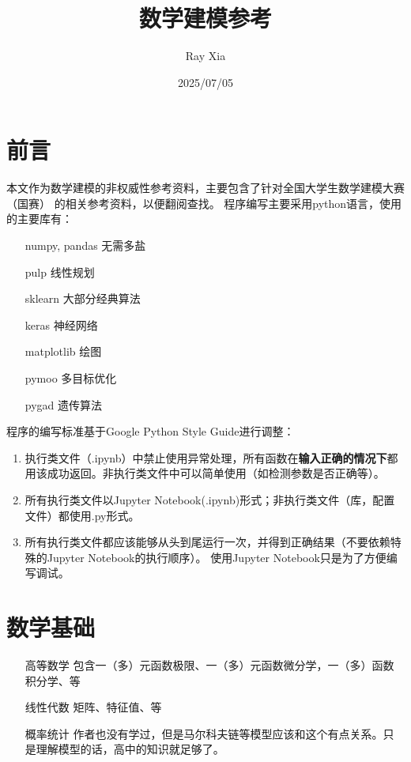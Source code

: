 \documentclass{article}
\title{数学建模参考}
\author{Ray Xia}
\date{2025/07/05}
\begin{document}
\maketitle

\tableofcontents

\newpage


\section{前言 }

本文作为数学建模的非权威性参考资料，主要包含了针对全国大学生数学建模大赛（国赛）
的相关参考资料，以便翻阅查找。
程序编写主要采用python语言，使用的主要库有：

\begin{itemize}
    \item[numpy, pandas] 无需多盐
    \item[pulp] 线性规划
    \item[sklearn] 大部分经典算法
    \item[keras] 神经网络
    \item[matplotlib] 绘图
    \item[pymoo] 多目标优化
    \item[pygad] 遗传算法
\end{itemize}

程序的编写标准基于Google Python Style Guide进行调整：

\begin{enumerate}
    \item 执行类文件（.ipynb）中禁止使用异常处理，所有函数在\textbf{输入正确的情况下}都用该成功返回。非执行类文件中可以简单使用（如检测参数是否正确等）。
    \item 所有执行类文件以Jupyter Notebook(.ipynb)形式；非执行类文件（库，配置文件）都使用.py形式。
    \item 所有执行类文件都应该能够从头到尾运行一次，并得到正确结果（不要依赖特殊的Jupyter Notebook的执行顺序）。
        使用Jupyter Notebook只是为了方便编写调试。
\end{enumerate}


\section{数学基础 }

\begin{itemize}
    \item[高等数学] 包含一（多）元函数极限、一（多）元函数微分学，一（多）函数积分学、等
    \item[线性代数] 矩阵、特征值、等
    \item[概率统计] 作者也没有学过，但是马尔科夫链等模型应该和这个有点关系。只是理解模型的话，高中的知识就足够了。
\end{itemize}
\end{document}
